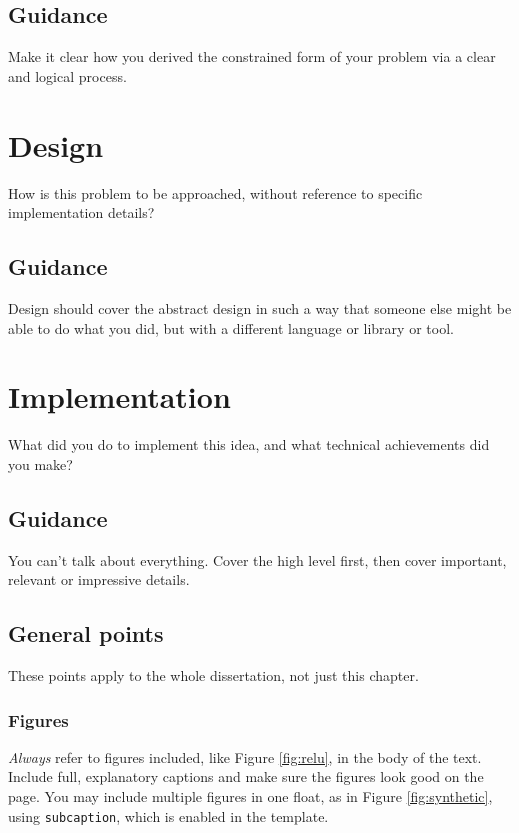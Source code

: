 \documentclass{l4proj}
\begin{document}
\section{Guidance}
Make it clear how you derived the constrained form of your problem via a clear and logical process. 

\chapter{Design}
\label{chap:des}
How is this problem to be approached, without reference to specific implementation details? 
\section{Guidance}
Design should cover the abstract design in such a way that someone else might be able to do what you did, but with a different language or library or tool.

\chapter{Implementation}
\label{chap:imp}
What did you do to implement this idea, and what technical achievements did you make?
\section{Guidance}
You can't talk about everything. Cover the high level first, then cover important, relevant or impressive details.



\section{General points}

These points apply to the whole dissertation, not just this chapter.



\subsection{Figures}
\emph{Always} refer to figures included, like Figure \ref{fig:relu}, in the body of the text. Include full, explanatory captions and make sure the figures look good on the page.
You may include multiple figures in one float, as in Figure \ref{fig:synthetic}, using \texttt{subcaption}, which is enabled in the template.
\end{document}
